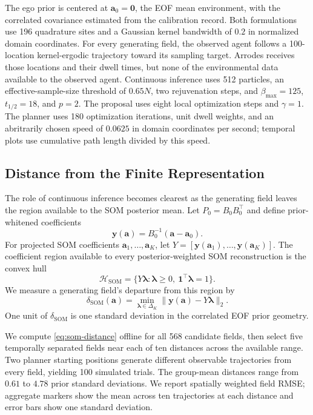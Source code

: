 \documentclass[letterpaper,10pt,conference]{ieeeconf}
\begin{document}
The ego prior is centered at $\boldsymbol a_0=\boldsymbol0$, the EOF mean environment, with the correlated covariance estimated from the calibration record. Both formulations use 196 quadrature sites and a Gaussian kernel bandwidth of $0.2$ in normalized domain coordinates. For every generating field, the observed agent follows a 100-location kernel-ergodic trajectory toward its sampling target. Arrodes receives those locations and their dwell times, but none of the environmental data available to the observed agent. Continuous inference uses 512 particles, an effective-sample-size threshold of $0.65N$, two rejuvenation steps, and $\beta_{\max}=125$, $t_{1/2}=18$, and $p=2$. The proposal uses eight local optimization steps and $\gamma=1$. The planner uses 180 optimization iterations, unit dwell weights, and an abritrarily chosen speed of $0.0625$ in domain coordinates per second; temporal plots use cumulative path length divided by this speed.

\subsection{Distance from the Finite Representation}

The role of continuous inference becomes clearest as the generating field leaves the region available to the SOM posterior mean. Let $P_0=B_0B_0^\top$ and define prior-whitened coefficients
\begin{equation}
  \boldsymbol y(\boldsymbol a)=B_0^{-1}(\boldsymbol a-\boldsymbol a_0).
\end{equation}
For projected SOM coefficients $\boldsymbol a_1,\ldots,\boldsymbol a_K$, let $Y=[\boldsymbol y(\boldsymbol a_1),\ldots,\boldsymbol y(\boldsymbol a_K)]$. The coefficient region available to every posterior-weighted SOM reconstruction is the convex hull
\begin{equation}
  \mathcal H_{\mathrm{SOM}}=\{Y\boldsymbol\lambda:\boldsymbol\lambda\geq0,
  \ \boldsymbol1^\top\boldsymbol\lambda=1\}.
\end{equation}
We measure a generating field's departure from this region by
\begin{equation}
  \delta_{\mathrm{SOM}}(\boldsymbol a)=
  \min_{\boldsymbol\lambda\in\Delta_K}
  \|\boldsymbol y(\boldsymbol a)-Y\boldsymbol\lambda\|_2.
  \label{eq:som-distance}
\end{equation}
One unit of $\delta_{\mathrm{SOM}}$ is one standard deviation in the correlated EOF prior geometry.

We compute \eqref{eq:som-distance} offline for all 568 candidate fields, then select five temporally separated fields near each of ten distances across the available range. Two planner starting positions generate different observable trajectories from every field, yielding 100 simulated trials. The group-mean distances range from $0.61$ to $4.78$ prior standard deviations. We report spatially weighted field RMSE; aggregate markers show the mean across ten trajectories at each distance and error bars show one standard deviation.
\end{document}
